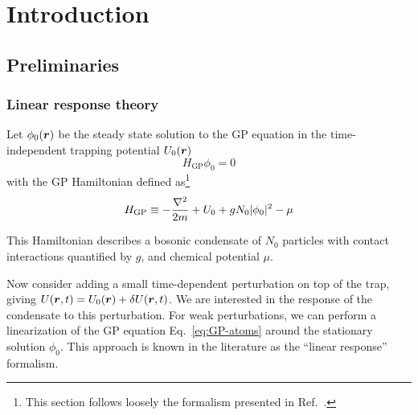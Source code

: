 \chapter{Introduction}



\section{Preliminaries}
\label{sec:preliminary}

\subsection{Linear response theory}
\label{subsec:linear-response}

Let $\phi_0(\bm{r})$ be the steady state solution to the
GP equation in the time-independent trapping potential $U_0(\bm{r})$
%
\begin{equation}\label{eq:GP-atoms}
  H_{\text{GP}} \phi_0 = 0
\end{equation}
% 
with the GP Hamiltonian defined as\footnote{This section follows
  loosely the formalism presented in Ref.~\cite{9783540410478}.}
%
\begin{equation}\label{eq:GP-ham}
  H_{\text{GP}} \equiv -\frac{\nabla^2}{2m} + U_0 + gN_0\vert \phi_0 \vert^2 - \mu
\end{equation}
% 

This Hamiltonian describes a bosonic condensate of $N_0$ particles with
contact interactions quantified by $g$, and chemical potential $\mu$.

Now consider adding a small time-dependent perturbation on top of the
trap, giving $U(\bm{r},t)=U_0(\bm{r}) + \delta U(\bm{r},t)$. We are interested
in the response of the condensate to this perturbation.  For weak
perturbations, we can perform a linearization of the GP equation
Eq.~\eqref{eq:GP-atoms} around the stationary solution $\phi_0$. This
approach is known in the literature as the ``linear response''
formalism.

